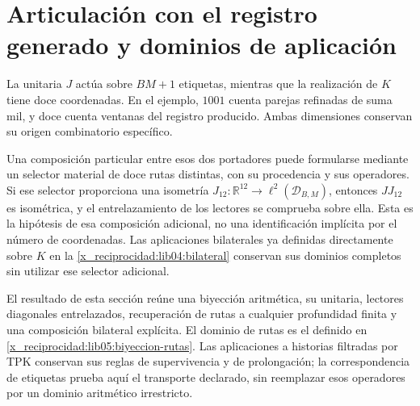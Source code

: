 \section{Articulación con el registro generado y dominios de aplicación}
\label{x_reciprocidad:lib05:dominios}

La unitaria \(J\) actúa sobre \(BM+1\) etiquetas, mientras que
la realización de \(K\) tiene doce coordenadas. En el ejemplo,
\(1001\) cuenta parejas refinadas de suma mil, y doce cuenta
ventanas del registro producido. Ambas dimensiones conservan su
origen combinatorio específico.

Una composición particular entre esos dos portadores puede formularse
mediante un selector material de doce rutas distintas, con su
procedencia y sus operadores. Si ese selector proporciona una
isometría
\(J_{12}:\mathbb R^{12}\to\ell^2(\mathcal D_{B,M})\), entonces
\(JJ_{12}\) es isométrica, y el entrelazamiento de los lectores se
comprueba sobre ella. Esta es la hipótesis de esa composición
adicional, no una identificación implícita por el número de
coordenadas. Las aplicaciones bilaterales ya definidas directamente
sobre \(K\) en la \cref{x_reciprocidad:lib04:bilateral} conservan sus dominios
completos sin utilizar ese selector adicional.

El resultado de esta sección reúne una biyección aritmética, su
unitaria, lectores diagonales entrelazados, recuperación de rutas a
cualquier profundidad finita y una composición bilateral explícita.
El dominio de rutas es el definido en
\eqref{x_reciprocidad:lib05:biyeccion-rutas}. Las aplicaciones a historias
filtradas por TPK conservan sus reglas de supervivencia y de
prolongación; la correspondencia de etiquetas prueba aquí el
transporte declarado, sin reemplazar esos operadores por un dominio
aritmético irrestricto.
